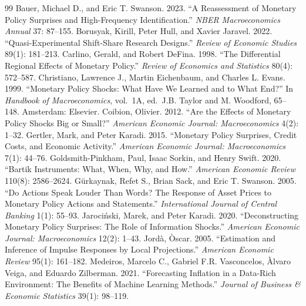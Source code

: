 \documentclass[11pt]{article}
\begin{document}
\clearpage
\renewcommand{\refname}{Bibliography}
\begin{thebibliography}{99}
 Bauer, Michael D., and Eric T. Swanson. 2023. ``A Reassessment of Monetary Policy Surprises and High-Frequency Identification.'' \textit{NBER Macroeconomics Annual} 37: 87--155.
 Borusyak, Kirill, Peter Hull, and Xavier Jaravel. 2022. ``Quasi-Experimental Shift-Share Research Designs.'' \textit{Review of Economic Studies} 89(1): 181--213.
 Carlino, Gerald, and Robert DeFina. 1998. ``The Differential Regional Effects of Monetary Policy.'' \textit{Review of Economics and Statistics} 80(4): 572--587.
 Christiano, Lawrence J., Martin Eichenbaum, and Charles L. Evans. 1999. ``Monetary Policy Shocks: What Have We Learned and to What End?'' In \textit{Handbook of Macroeconomics}, vol.\ 1A, ed.\ J.B. Taylor and M. Woodford, 65--148. Amsterdam: Elsevier.
 Coibion, Olivier. 2012. ``Are the Effects of Monetary Policy Shocks Big or Small?'' \textit{American Economic Journal: Macroeconomics} 4(2): 1--32.
 Gertler, Mark, and Peter Karadi. 2015. ``Monetary Policy Surprises, Credit Costs, and Economic Activity.'' \textit{American Economic Journal: Macroeconomics} 7(1): 44--76.
 Goldsmith-Pinkham, Paul, Isaac Sorkin, and Henry Swift. 2020. ``Bartik Instruments: What, When, Why, and How.'' \textit{American Economic Review} 110(8): 2586--2624.
 G\"urkaynak, Refet S., Brian Sack, and Eric T. Swanson. 2005. ``Do Actions Speak Louder Than Words? The Response of Asset Prices to Monetary Policy Actions and Statements.'' \textit{International Journal of Central Banking} 1(1): 55--93.
 Jaroci\'nski, Marek, and Peter Karadi. 2020. ``Deconstructing Monetary Policy Surprises: The Role of Information Shocks.'' \textit{American Economic Journal: Macroeconomics} 12(2): 1--43.
 Jord\`a, \`Oscar. 2005. ``Estimation and Inference of Impulse Responses by Local Projections.'' \textit{American Economic Review} 95(1): 161--182.
 Medeiros, Marcelo C., Gabriel F.R. Vasconcelos, \`Alvaro Veiga, and Eduardo Zilberman. 2021. ``Forecasting Inflation in a Data-Rich Environment: The Benefits of Machine Learning Methods.'' \textit{Journal of Business \& Economic Statistics} 39(1): 98--119.

\end{thebibliography}
\end{document}
